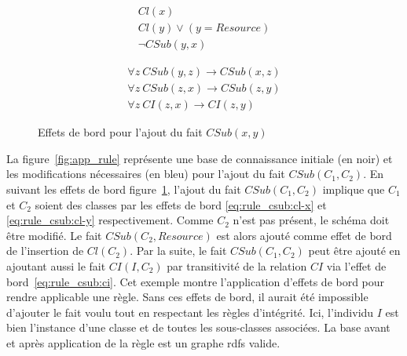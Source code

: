 \begin{figure}[htb]
    \begin{subfigure}{.45\textwidth}
        \begin{align}
            Cl(x) \label{eq:rule_csub:cl-x}\\
            Cl(y) \lor (y = Resource) \label{eq:rule_csub:cl-y}\\
            \neg CSub(y, x) \label{eq:rule_csub:not-csub}
        \end{align}
    \end{subfigure}
    \hfill
    \begin{subfigure}{.4\textwidth}
        \begin{align}
            \forall z ~ CSub(y, z) \to CSub(x, z) \label{eq:rule_csub:csub-bot}\\
            \forall z ~ CSub(z, x) \to CSub(z, y) \label{eq:rule_csub:csub-top}\\
            \forall z ~ CI(z, x) \to CI(z, y) \label{eq:rule_csub:ci}
        \end{align}
    \end{subfigure}
    \caption{Effets de bord pour l'ajout du fait $CSub(x, y)$}
    \label{eq:rule_csub}
\end{figure}

\begin{example}
    La figure~\ref{fig:app_rule} représente une base de connaissance initiale (en noir) et les modifications nécessaires (en bleu) pour l'ajout du fait $CSub(C_1, C_2)$.
    En suivant les effets de bord figure~\ref{eq:rule_csub}, l'ajout du fait $CSub(C_1, C_2)$ implique que $C_1$ et $C_2$ soient des classes par les effets de bord \ref{eq:rule_csub:cl-x} et \ref{eq:rule_csub:cl-y} respectivement.
    Comme $C_2$ n'est pas présent, le schéma doit être modifié.
    Le fait $CSub(C_2, Resource)$ est alors ajouté comme effet de bord de l'insertion de $Cl(C_2)$.
    Par la suite, le fait $CSub(C_1, C_2)$ peut être ajouté en ajoutant aussi le fait $CI(I, C_2)$ par transitivité de la relation $CI$ via l'effet de bord~\ref{eq:rule_csub:ci}.
    Cet exemple montre l'application d'effets de bord pour rendre applicable une règle.
    Sans ces effets de bord, il aurait été impossible d'ajouter le fait voulu tout en respectant les règles d'intégrité.
    Ici, l'individu $I$ est bien l'instance d'une classe et de toutes les sous-classes associées.
    La base avant et après application de la règle est un graphe \gls{rdfs} valide.
\end{example}

